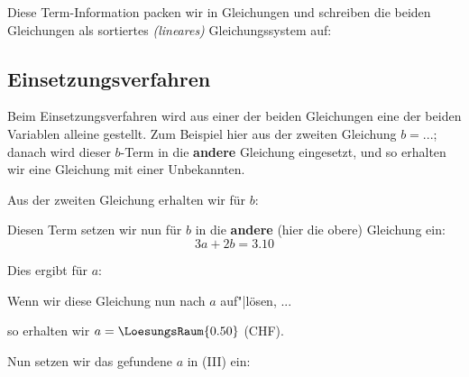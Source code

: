 
Diese Term-Information packen wir in Gleichungen und schreiben die
beiden Gleichungen als sortiertes \textit{(lineares)} Gleichungssystem auf:



\subsection{Einsetzungsverfahren}\label{einsetzungsverfahren}
Beim Einsetzungsverfahren wird aus einer der beiden Gleichungen eine der beiden Variablen alleine gestellt. Zum Beispiel hier aus der zweiten Gleichung $b = ...$; danach wird dieser $b$-Term in die \textbf{andere} Gleichung eingesetzt, und so erhalten wir eine Gleichung mit einer Unbekannten.


Aus der zweiten Gleichung erhalten wir für $b$:


Diesen Term setzen wir nun für $b$ in die \textbf{andere} (hier die obere) Gleichung ein:
$$3a+2b = 3.10$$

Dies ergibt für $a$:


Wenn wir diese Gleichung nun nach $a$ auf"|lösen, ...


so erhalten wir $a = \LoesungsRaum{0.50}$ (CHF).


Nun setzen wir das gefundene $a$ in (III) ein:

